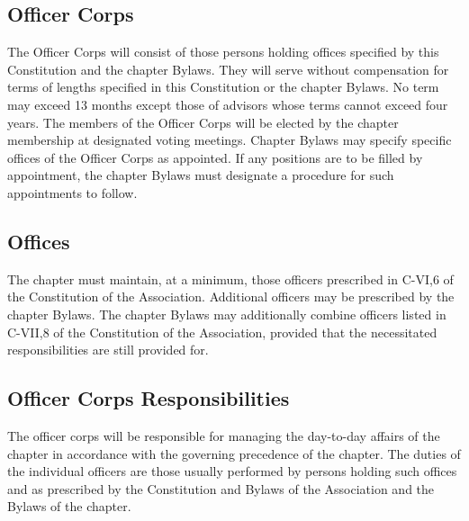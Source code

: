 \subsection{Officer Corps} \label{III.3}
The Officer Corps will consist of those persons holding offices specified by this Constitution and the chapter Bylaws.
They will serve without compensation for terms of lengths specified in this Constitution or the chapter Bylaws.
No term may exceed 13 months except those of advisors whose terms cannot exceed four years.
The members of the Officer Corps will be elected by the chapter membership at designated voting meetings.
Chapter Bylaws may specify specific offices of the Officer Corps as appointed.
If any positions are to be filled by appointment, the chapter Bylaws must designate a procedure for such appointments to follow.

\subsection{Offices} \label{III.4}
The chapter must maintain, at a minimum, those officers prescribed in C-VI,6 of the Constitution of the Association.
Additional officers may be prescribed by the chapter Bylaws.
The chapter Bylaws may additionally combine officers listed in C-VII,8 of the Constitution of the Association, provided that the necessitated responsibilities are still provided for.

\subsection{Officer Corps Responsibilities} \label{III.5}
The officer corps will be responsible for managing the day-to-day affairs of the chapter in accordance with the governing precedence of the chapter.
The duties of the individual officers are those usually performed by persons holding such offices and as prescribed by the Constitution and Bylaws of the Association and the Bylaws of the chapter.

